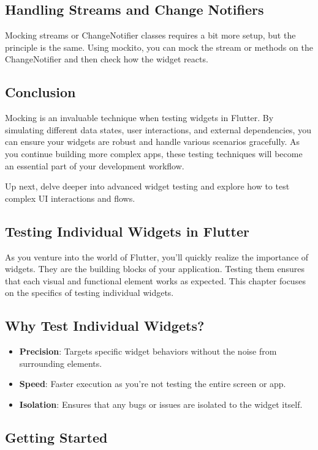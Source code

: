 \subsection*{Handling Streams and Change Notifiers}
Mocking streams or ChangeNotifier classes requires a bit more setup, but the principle is the same. Using mockito, you can mock the stream or methods on the ChangeNotifier and then check how the widget reacts.

\subsection*{Conclusion}
Mocking is an invaluable technique when testing widgets in Flutter. 
By simulating different data states, user interactions, and external dependencies, you can ensure your widgets are robust and handle various scenarios gracefully. 
As you continue building more complex apps, these testing techniques will become an essential part of your development workflow.

Up next, delve deeper into advanced widget testing and explore how to test complex UI interactions and flows.


\subsection{Testing Individual Widgets in Flutter}
As you venture into the world of Flutter, you'll quickly realize the importance of widgets. 
They are the building blocks of your application. 
Testing them ensures that each visual and functional element works as expected. 
This chapter focuses on the specifics of testing individual widgets.

\subsection*{Why Test Individual Widgets?}

\begin{itemize}
 \item \textbf{Precision}: Targets specific widget behaviors without the noise from surrounding elements.
 \item \textbf{Speed}: Faster execution as you're not testing the entire screen or app.
 \item \textbf{Isolation}: Ensures that any bugs or issues are isolated to the widget itself.
\end{itemize}

\subsection*{Getting Started}

